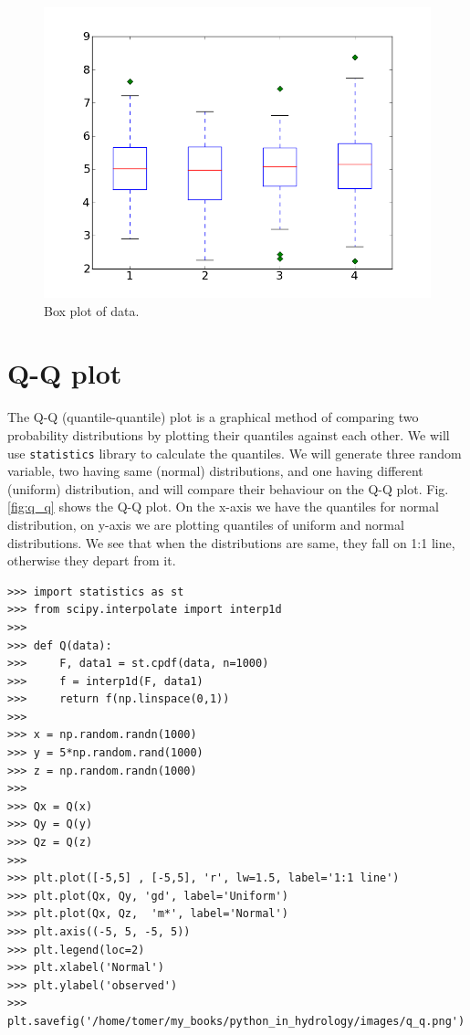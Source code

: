 \documentclass[10pt]{book}
\begin{document}
\beforefig
\begin{figure}[h!]
  \centering
    \includegraphics[scale=0.5]{images/boxplot.png}
  \caption{Box plot of data.}
   \label{fig:boxplot}
\end{figure}
\afterfig

\section{Q-Q plot}
The Q-Q (quantile-quantile) plot is a graphical method of comparing two probability distributions by plotting their quantiles against each other. We will use \verb"statistics" library to calculate the quantiles. We will generate three random variable, two having same (normal) distributions, and one having different (uniform) distribution, and will compare their behaviour on the Q-Q plot. Fig. \ref{fig:q_q} shows the Q-Q plot. On the x-axis we have the quantiles for normal distribution, on y-axis we are plotting quantiles of uniform and normal distributions. We  see that when the distributions are same, they fall on 1:1 line, otherwise they depart from it. 
\beforeverb \begin{verbatim}
>>> import statistics as st
>>> from scipy.interpolate import interp1d
>>> 
>>> def Q(data):
>>>     F, data1 = st.cpdf(data, n=1000)
>>>     f = interp1d(F, data1)
>>>     return f(np.linspace(0,1))
>>> 
>>> x = np.random.randn(1000)
>>> y = 5*np.random.rand(1000)
>>> z = np.random.randn(1000)
>>> 
>>> Qx = Q(x)
>>> Qy = Q(y)
>>> Qz = Q(z)
>>> 
>>> plt.plot([-5,5] , [-5,5], 'r', lw=1.5, label='1:1 line')
>>> plt.plot(Qx, Qy, 'gd', label='Uniform')
>>> plt.plot(Qx, Qz,  'm*', label='Normal')
>>> plt.axis((-5, 5, -5, 5))
>>> plt.legend(loc=2)
>>> plt.xlabel('Normal')
>>> plt.ylabel('observed')
>>> plt.savefig('/home/tomer/my_books/python_in_hydrology/images/q_q.png')
\end{verbatim} \afterverb
\end{document}
